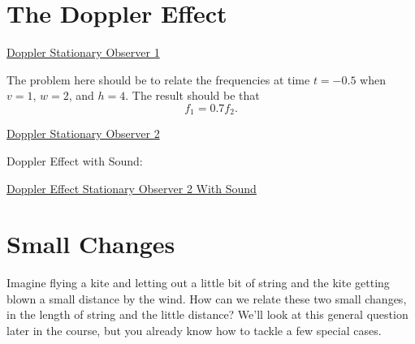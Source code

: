 \documentclass{ximera}
\begin{document}
\section*{The Doppler Effect}

\begin{onlineOnly}
    \begin{center}
\end{center}
\end{onlineOnly}

\href{https://www.desmos.com/calculator/zk06s3k6q4}{Doppler Stationary Observer 1}


The problem here should be to relate the frequencies at time $t=-0.5$ when $v=1$, $w=2$, and $h=4$. The result should be that 
\[
    f_1 = 0.7 f_2 . 
\]


\begin{onlineOnly}
    \begin{center}
\end{center}
\end{onlineOnly}

\href{https://www.desmos.com/calculator/celviaogz7}{Doppler Stationary Observer 2}

Doppler Effect with Sound:

\begin{onlineOnly}
    \begin{center}
\end{center}
\end{onlineOnly}

\href{https://www.desmos.com/calculator/gxzmjpgkrr}{Doppler Effect Stationary Observer 2 With Sound}










\section*{Small Changes}
Imagine flying a kite and letting out a little bit of string and the kite getting blown a small distance by the wind. How can we relate these two small changes, in the length of string and the little distance? We'll look at this general question later in the course, but you already know how to tackle a few special cases.
\end{document}
